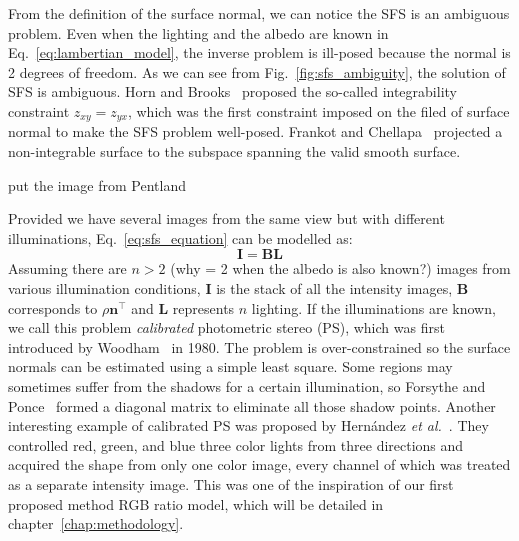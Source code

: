 From the definition of the surface normal, we can notice the SFS is an ambiguous problem. 
Even when the lighting and the albedo are known in Eq.~\ref{eq:lambertian_model}, the inverse problem is ill-posed because the normal is 2 degrees of freedom. 
As we can see from Fig.~\ref{fig:sfs_ambiguity}, the solution of SFS is ambiguous.
Horn and Brooks~\cite{horn1986variational} proposed the so-called integrability constraint $z_{xy} = z_{yx}$, which was the first constraint imposed on the filed of surface normal to make the SFS problem well-posed. 
Frankot and Chellapa~\cite{frankot1988method} projected a non-integrable surface to the subspace spanning the valid smooth surface.

{\color{red} put the image from Pentland}


Provided we have several images from the same view but with different illuminations, Eq.~\ref{eq:sfs_equation} can be modelled as:
\begin{equation}\label{eq:ps_equation}
    \mathbf{I = BL}
\end{equation}
Assuming there are $n > 2$ {\color{red}(why = 2 when the albedo is also known?)} images from various illumination conditions, $\mathbf{I}$ is the stack of all the intensity images, $\mathbf{B}$ corresponds to $\rho \mathbf{n}^\top$ and $\mathbf{L}$ represents $n$ lighting.
If the illuminations are known, we call this problem \emph{calibrated} photometric stereo (PS), which was first introduced by Woodham~\cite{woodham1980photometric} in 1980. The problem is over-constrained so the surface normals can be estimated using a simple least square. 
Some regions may sometimes suffer from the shadows for a certain illumination, so Forsythe and Ponce~\cite{forsyth2003modern} formed a diagonal matrix to eliminate all those shadow points.
Another interesting example of calibrated PS was proposed by Hern{\'a}ndez \emph{et al.}~\cite{hernandez2011overcoming}.
They controlled red, green, and blue three color lights from three directions and acquired the shape from only one color image, every channel of which was treated as a separate intensity image.   
This was one of the inspiration of our first proposed method RGB ratio model, which will be detailed in chapter~\ref{chap:methodology}.

